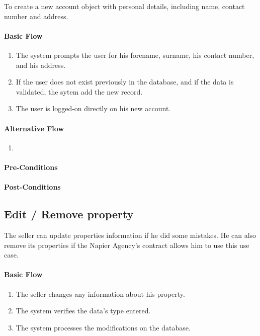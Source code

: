 \documentclass[a4paper,12pt]{article}
\begin{document}
To create a new account object with personal details, including name, contact number and address.

\paragraph{Basic Flow}
\begin{enumerate}
\item The system prompts the user for his forename, surname, his contact number, and his address.
\item If the user does not exist previously in the database, and if the data is validated, the sytem add the new record.
\item The user is logged-on directly on his new account.
\end{enumerate}
\paragraph{Alternative Flow}
\begin{enumerate}
\item
\end{enumerate}
\paragraph{Pre-Conditions}
\paragraph{Post-Conditions}

\subsection{Edit / Remove property}

The seller can update properties information if he did some mistakes. He can also remove its properties if the Napier Agency's contract allows him to use this use case.

\paragraph{Basic Flow}
\begin{enumerate}
\item The seller changes any information about his property.
\item The system verifies the data's type entered.
\item The system processes the modifications on the database.
\end{enumerate}
\end{document}

